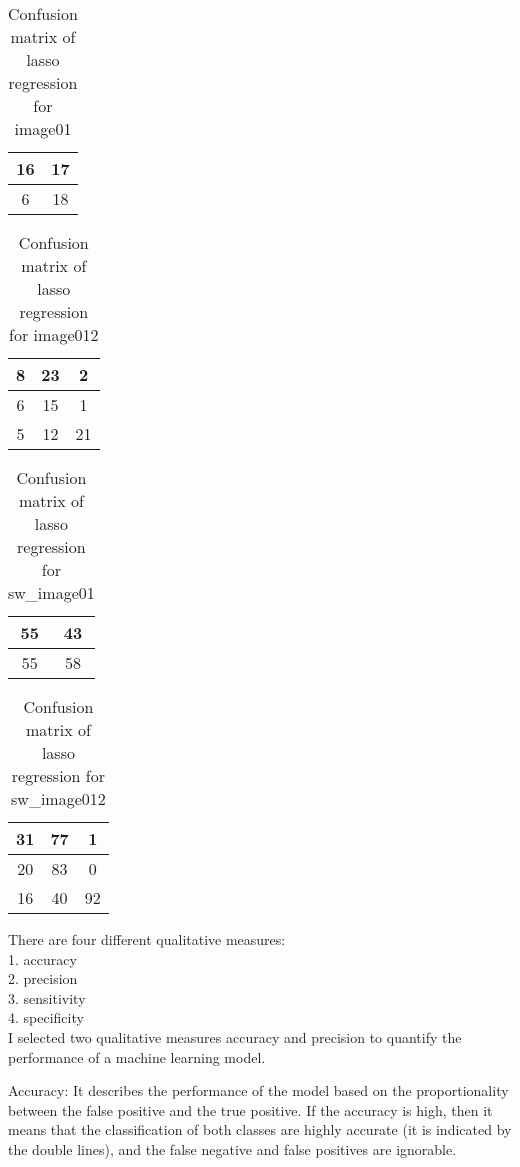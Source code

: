 \documentclass[conference,12pt]{IEEEtran}
\begin{document}
\begin{table}[h!]
\centering
\caption{Confusion matrix of lasso regression for image01}
\begin{tabular}{|c|c|}
\hline
16 & 17 \\ \hline
6  & 18 \\ \hline
\end{tabular}
\end{table}

\begin{table}[h!]
\centering
\caption{Confusion matrix of lasso regression for image012}
\begin{tabular}{|c|c|c|}
\hline
8 & 23 & 2 \\ \hline
6 & 15 & 1 \\ \hline
5 & 12 & 21 \\ \hline
\end{tabular}
\end{table}

\begin{table}[h!]
\centering
\caption{Confusion matrix of lasso regression for sw\_image01}
\begin{tabular}{|c|c|}
\hline
55 & 43 \\ \hline
55  & 58 \\ \hline
\end{tabular}
\end{table}

\begin{table}[h!]
\centering
\caption{Confusion matrix of lasso regression for sw\_image012}
\begin{tabular}{|c|c|c|}
\hline
31 & 77 & 1 \\ \hline
20 & 83 & 0 \\ \hline
16 & 40 & 92 \\ \hline
\end{tabular}
\end{table}

There are four different qualitative measures:
\\
1. accuracy\\
2. precision\\
3. sensitivity\\
4. specificity\\

I selected two qualitative measures accuracy and precision to quantify the performance of a machine learning model.

Accuracy: It describes the performance of the model based on the proportionality between the false positive and the true positive. If the accuracy is high, then it means that the classification of both classes are highly accurate (it is indicated by the double lines), and the false negative and false positives are ignorable.
\end{document}
